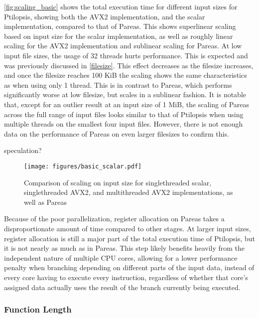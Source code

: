 \documentclass[11pt,dvipsnames]{article}
\newcommand{\helpme}[1]{{\color{red}#1}}
\begin{document}
\autoref{fig:scaling_basic} shows the total execution time for different input sizes for Ptilopsis, showing both the AVX2 implementation, and the scalar implementation, compared to that of Pareas. This shows superlinear scaling based on input size for the scalar implementation, as well as roughly linear scaling for the AVX2 implementation and sublinear scaling for Pareas. At low input file sizes, the usage of 32 threads hurts performance. This is expected and was previously discussed in \autoref{filesize}. This effect decreases as the filesize increases, and once the filesize reaches 100 KiB the scaling shows the same characteristics as when using only 1 thread. This is in contrast to Pareas, which performs significantly worse at low filesize, but scales in a sublinear fashion. It is notable that, except for an outlier result at an input size of 1 MiB, the scaling of Pareas across the full range of input files looks similar to that of Ptilopsis when using multiple threads on the smallest four input files. However, there is not enough data on the performance of Pareas on even larger filesizes to confirm this.

\helpme{speculation?}

\begin{figure}[ht]
    \centering
    \texttt{[image: figures/basic\_scalar.pdf]}
    \caption{Comparison of scaling on input size for singlethreaded scalar, singlethreaded AVX2, and multithreaded AVX2 implementations, as well as Pareas}
    \label{fig:scaling_basic}
\end{figure}

Because of the poor parallelization, register allocation on Pareas takes a disproportionate amount of time compared to other stages. At larger input sizes, register allocation is still a major part of the total execution time of Ptilopsis, but it is not nearly as much as in Pareas. This step likely benefits heavily from the independent nature of multiple CPU cores, allowing for a lower performance penalty when branching depending on different parts of the input data, instead of every core having to execute every instruction, regardless of whether that core's assigned data actually uses the result of the branch currently being executed.

\subsubsection*{Function Length} \label{compare_funclen}
\end{document}
